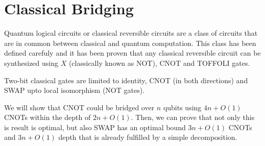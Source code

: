 \documentclass{report}
\begin{document}
\section{Classical Bridging}\label{sec:classical_bridging}

Quantum logical circuits or classical reversible circuits are a class of circuits that are in common between classical and quantum computation. This class has been defined carefuly \cite{shende2006} and it has been proven that any classical reversible circuit can be synthesized using $X$ (classically known as NOT), CNOT and TOFFOLI gates.

Two-bit classical gates are limited to identity, CNOT (in both directions) and SWAP upto local isomorphism (NOT gates).

We will show that CNOT could be bridged over $n$ qubits using $4n + O(1)$ CNOTs within the depth of $2n + O(1)$. Then, we can prove that not only this is result is optimal, but also SWAP has an optimal bound $3n + O(1)$ CNOTs and $3n + O(1)$ depth that is already fulfilled by a simple decomposition.
\end{document}
